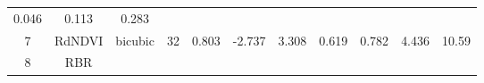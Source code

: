 \documentclass[twoside,12pt,final]{ucthesis-CA2012}
\begin{document}
\begin{ucmainmatter}
\begin{longtable}[]{@{}ccccccccccc@{}}
\begin{minipage}[t]{0.05\columnwidth}
0.046\strut
\end{minipage} & \begin{minipage}[t]{0.05\columnwidth}\centering\strut
0.113\strut
\end{minipage} & \begin{minipage}[t]{0.05\columnwidth}\centering\strut
0.283\strut
\end{minipage}\tabularnewline
\begin{minipage}[t]{0.04\columnwidth}\centering\strut
7\strut
\end{minipage} & \begin{minipage}[t]{0.11\columnwidth}\centering\strut
RdNDVI\strut
\end{minipage} & \begin{minipage}[t]{0.06\columnwidth}\centering\strut
bicubic\strut
\end{minipage} & \begin{minipage}[t]{0.08\columnwidth}\centering\strut
32\strut
\end{minipage} & \begin{minipage}[t]{0.08\columnwidth}\centering\strut
0.803\strut
\end{minipage} & \begin{minipage}[t]{0.07\columnwidth}\centering\strut
-2.737\strut
\end{minipage} & \begin{minipage}[t]{0.07\columnwidth}\centering\strut
3.308\strut
\end{minipage} & \begin{minipage}[t]{0.07\columnwidth}\centering\strut
0.619\strut
\end{minipage} & \begin{minipage}[t]{0.05\columnwidth}\centering\strut
0.782\strut
\end{minipage} & \begin{minipage}[t]{0.05\columnwidth}\centering\strut
4.436\strut
\end{minipage} & \begin{minipage}[t]{0.05\columnwidth}\centering\strut
10.59\strut
\end{minipage}\tabularnewline
\begin{minipage}[t]{0.04\columnwidth}\centering\strut
8\strut
\end{minipage} & \begin{minipage}[t]{0.11\columnwidth}\centering\strut
RBR\strut
\end{minipage} & \begin{minipage}[t]{0.06\columnwidth}\centering\strut

\end{minipage}
\end{longtable}
\end{ucmainmatter}
\end{document}
